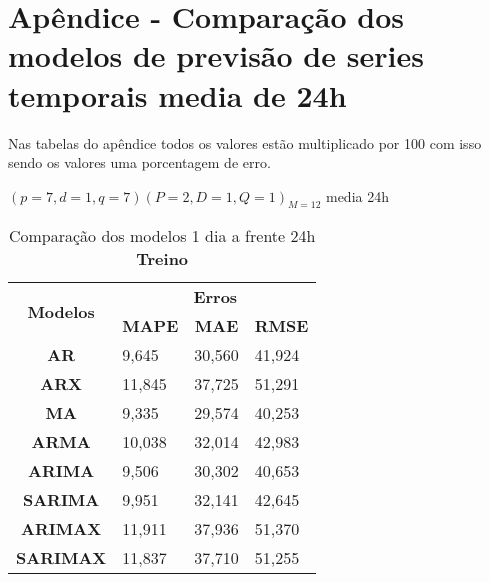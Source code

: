 
\section{Apêndice - Comparação dos modelos de previsão de series temporais media de 24h}\label{sec:comtb24}

Nas tabelas do apêndice todos os valores estão multiplicado por 100 com isso sendo os valores uma porcentagem de erro.

$(p = 7,d = 1,q = 7) (P = 2,D = 1,Q = 1)_{M = 12}$ media 24h
	\begin{table}[H]
	\centering
	\caption{Comparação dos modelos 1 dia a frente 24h \textbf{Treino} }\label{tb:1-24trn}
	\begin{tabular}{@{}clll@{}}
		\toprule
		\multirow{2}{*}{\textbf{Modelos}} & \multicolumn{3}{c}{\textbf{Erros}}                                                                       \\ \cmidrule(l){2-4} 
		& \multicolumn{1}{c}{\textbf{MAPE}} & \multicolumn{1}{c}{\textbf{MAE}} & \multicolumn{1}{c}{\textbf{RMSE}} \\ \hline
\textbf{AR}                       & 9,645                             & 30,560                           & 41,924                            \\
\textbf{ARX}                      & 11,845                            & 37,725                           & 51,291                            \\
\textbf{MA}                       & 9,335                             & 29,574                           & 40,253                            \\
\textbf{ARMA}                     & 10,038                            & 32,014                           & 42,983                            \\
\textbf{ARIMA}                    & 9,506                             & 30,302                           & 40,653                            \\
\textbf{SARIMA}                   & 9,951                             & 32,141                           & 42,645                            \\
\textbf{ARIMAX}                   & 11,911                            & 37,936                           & 51,370                            \\
\textbf{SARIMAX}                  & 11,837                            & 37,710                           & 51,255                            \\

\end{tabular}
\end{table}
